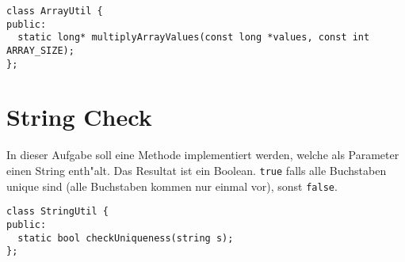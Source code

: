 \documentclass[a4paper,10pt]{article}
\begin{document}
\begin{lstlisting}
class ArrayUtil {
public:
  static long* multiplyArrayValues(const long *values, const int ARRAY_SIZE);
};
\end{lstlisting}

\section{String Check}
In dieser Aufgabe soll eine Methode implementiert werden, welche als Parameter einen String enth"alt.
Das Resultat ist ein Boolean. \verb|true| falls alle Buchstaben unique sind (alle Buchstaben kommen nur
einmal vor), sonst \verb|false|.

\vspace{3mm}

\begin{lstlisting}
class StringUtil {
public:
  static bool checkUniqueness(string s);
};
\end{lstlisting}
\end{document}
